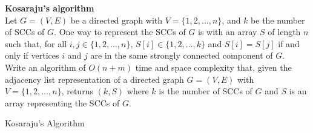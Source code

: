 \textbf{Kosaraju's algorithm} \\
Let $G= (V,E)$ be a directed graph with $V= \{1,2,\ldots,n\}$, and $k$ be the number of SCCs of $G$. One
way to represent the SCCs of $G$ is with an array $S$ of length $n$ such that, for all $i,j \in \{1,2,\ldots,n\}$,
$S[i] \in \{1,2,\ldots,k\}$ and $S[i] = S[j]$ if and only if vertices $i$ and $j$ are in the same strongly connected
component of $G$. \\

Write an algorithm of $O(n+m)$ time and space complexity that, given the adjacency list representation
of a directed graph $G= (V,E)$ with $V= \{1,2,\ldots,n\}$, returns $(k,S)$ where $k$ is the number of SCCs
of $G$ and $S$ is an array representing the SCCs of $G$.

\begin{algorithm}
    \caption{Kosaraju's Algorithm}




\end{algorithm}

